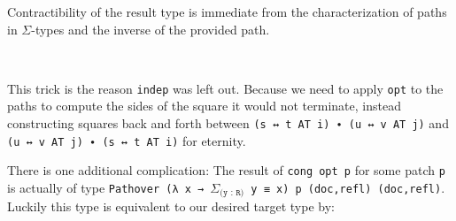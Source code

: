 Contractibility of the result type is immediate from the characterization of paths
in $\Sigma$-types and the inverse of the provided path.
\begin{code}%
%
\>[2]\AgdaSpace{}%
\AgdaSymbol{:}\AgdaSpace{}%
\AgdaSymbol{\{}\AgdaSpace{}%
\AgdaSymbol{:}\AgdaSpace{}%
\AgdaSymbol{\}}\AgdaSpace{}%
\AgdaSpace{}%
\AgdaSymbol{(}\AgdaSpace{}%
\AgdaSymbol{:}\AgdaSpace{}%
\AgdaSymbol{)}\AgdaSpace{}%
\AgdaSpace{}%
\AgdaSpace{}%
\AgdaSymbol{(}\AgdaFunction{Σ[}\AgdaSpace{}%
\AgdaSpace{}%
\AgdaSpace{}%
\AgdaSpace{}%
\AgdaFunction{]}\AgdaSpace{}%
\AgdaSpace{}%
\AgdaSpace{}%
\AgdaSymbol{)}\<%
\\
%
\>[2]\AgdaSpace{}%
\AgdaSpace{}%
\AgdaSymbol{=}\AgdaSpace{}%
\AgdaSymbol{(}\AgdaSpace{}%
\AgdaOperator{\AgdaInductiveConstructor{,}}\AgdaSpace{}%
\AgdaSymbol{)}\AgdaSpace{}%
\AgdaOperator{\AgdaInductiveConstructor{,}}\AgdaSpace{}%
\AgdaSpace{}%
\AgdaSymbol{(\AgdaUnderscore{}}\AgdaSpace{}%
\AgdaOperator{\AgdaInductiveConstructor{,}}\AgdaSpace{}%
\AgdaSymbol{)}\AgdaSpace{}%
\AgdaSpace{}%
\AgdaSpace{}%
\AgdaSymbol{(}\AgdaSpace{}%
\AgdaSpace{}%
\AgdaOperator{\AgdaInductiveConstructor{,}}\AgdaSpace{}%
\AgdaSpace{}%
\AgdaSpace{}%
\AgdaSpace{}%
\AgdaSpace{}%
\AgdaSpace{}%
\AgdaSymbol{(}\AgdaOperator{\AgdaPrimitive{\textasciitilde{}}}\AgdaSpace{}%
\AgdaSpace{}%
\AgdaSpace{}%
\AgdaSymbol{)))}\<%
\end{code}

This trick is the reason \texttt{indep} was left out. Because we need to apply \texttt{opt} to
the paths to compute the sides of the square it would not terminate, instead constructing squares
back and forth between \texttt{(s ↔ t AT i) ∙ (u ↔ v AT j)} and \texttt{(u ↔ v AT j) ∙ (s ↔ t AT i)}
for eternity.

There is one additional complication: The result of \texttt{cong opt p} for some patch \texttt{p}
is actually of type \texttt{Pathover (λ x → $\Sigma_\texttt{(y : R)}$ y ≡ x) p (doc,refl) (doc,refl)}.
Luckily this type is equivalent to our desired target type by:

